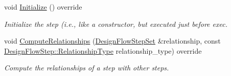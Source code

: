 \begin{DoxyCompactItemize}
void \hyperlink{classparametric__list__based_a33b5a6aadaf0f36b342b434126ebbf79}{Initialize} () override
\begin{DoxyCompactList}\small\item\em Initialize the step (i.\+e., like a constructor, but executed just before exec. \end{DoxyCompactList}\item 
void \hyperlink{classparametric__list__based_af4154cabe85bbd707fc5ee05981e54b0}{Compute\+Relationships} (\hyperlink{classDesignFlowStepSet}{Design\+Flow\+Step\+Set} \&relationship, const \hyperlink{classDesignFlowStep_a723a3baf19ff2ceb77bc13e099d0b1b7}{Design\+Flow\+Step\+::\+Relationship\+Type} relationship\+\_\+type) override
\begin{DoxyCompactList}\small\item\em Compute the relationships of a step with other steps. \end{DoxyCompactList}\end{DoxyCompactItemize}
